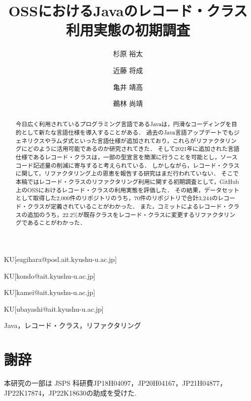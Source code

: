 \documentclass[submit,techrep,noauthor]{ipsj}
\begin{document}
\title{OSSにおけるJavaのレコード・クラス利用実態の初期調査}



\author{杉原 裕太}{}{KU}[sugihara@posl.ait.kyushu-u.ac.jp]
\author{近藤 将成}{}{KU}[kondo@ait.kyushu-u.ac.jp]
\author{亀井 靖高}{}{KU}[kamei@ait.kyushu-u.ac.jp]
\author{鵜林 尚靖}{}{KU}[ubayashi@ait.kyushu-u.ac.jp]

\begin{abstract}
  今日広く利用されているプログラミング言語であるJavaは，円滑なコーディングを目的として新たな言語仕様を導入することがある．
  過去のJava言語アップデートでもジェネリクスやラムダ式といった言語仕様が追加されており，これらがリファクタリングにどのように活用可能であるのか研究されてきた．
  そして2021年に追加された言語仕様であるレコード・クラスは，一部の型宣言を簡潔に行うことを可能とし，ソースコード記述量の削減に寄与すると考えられている．
  しかしながら，レコード・クラスに関して，リファクタリング上の恩恵を報告する研究はまだ行われていない．
  そこで本稿ではレコード・クラスのリファクタリング利用に関する初期調査として，GitHub上のOSSにおけるレコード・クラスの利用実態を評価した．
  その結果，データセットとして取得した2,000件のリポジトリのうち，70件のリポジトリで合計3,244のレコード・クラスが定義されていることがわかった．
  また，コミットによるレコード・クラスの追加のうち，22.2\%が既存クラスをレコード・クラスに変更するリファクタリングであることがわかった．
\end{abstract}

\begin{jkeyword}
  Java，レコード・クラス，リファクタリング
\end{jkeyword}

\maketitle

\setcounter{page}{1}

{\large






}

\section*{謝辞}
本研究の一部は JSPS 科研費JP18H04097，JP20H04167，JP21H04877，JP22K17874，JP22K18630の助成を受けた.


%


\end{document}
